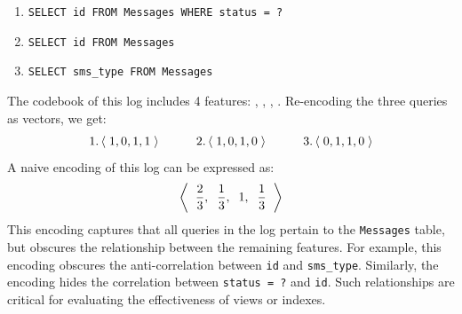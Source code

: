 \begin{enumerate}
\item \lstinline{SELECT id FROM Messages WHERE status = ?}\\[-6mm]
\item \lstinline{SELECT id FROM Messages}\\[-6mm]
\item \lstinline{SELECT sms_type FROM Messages}\\[-5mm]
\end{enumerate}
The codebook of this log includes 4 features:
,
,
,
.
Re-encoding the three queries as vectors, we get: 
$$\text{1.}\tuple{1, 0, 1, 1} \hspace{10mm} \text{2.} \tuple{1, 0, 1, 0} \hspace{10mm} \text{3.} \tuple{0, 1, 1, 0}$$
A naive encoding of this log 
can be expressed as:
$$\left<\;{\hspace{1mm}\frac{2}{3}, \hspace{2mm} \frac{1}{3}, \hspace{2mm} 1, \hspace{2mm} \frac{1}{3}\hspace{1mm}}\;\right>$$
This encoding captures that all queries in the log pertain to the \lstinline{Messages} table, but obscures the relationship between the remaining features.
For example, this encoding obscures the anti-correlation between \lstinline{id} and \lstinline{sms_type}.
Similarly, the encoding hides the correlation between \lstinline{status = ?} and \lstinline{id}.  
Such relationships are critical for evaluating the effectiveness of views or indexes.

